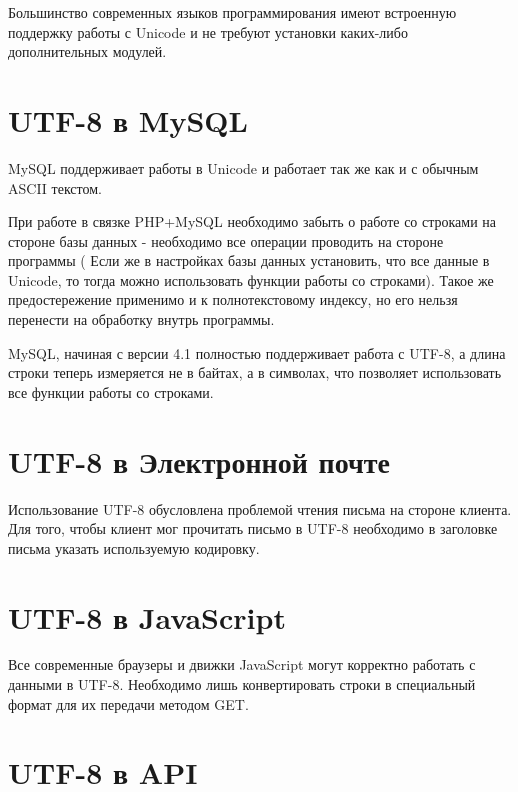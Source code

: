 Большинство современных языков программирования имеют встроенную поддержку работы с Unicode  и не требуют установки каких-либо дополнительных модулей. 


\section{ UTF-8 в MySQL } \label{sect3_11}

MySQL поддерживает работы в Unicode и работает так же как и с обычным ASCII текстом.

При работе в связке PHP+MySQL необходимо забыть о работе со строками на стороне базы данных - необходимо все операции проводить на стороне программы ( Если же в настройках базы данных установить, что все данные в Unicode, то тогда можно использовать функции работы со строками). Такое же предостережение применимо и к полнотекстовому индексу, но его нельзя перенести на обработку внутрь программы.


MySQL, начиная с версии 4.1 полностью поддерживает работа с UTF-8, а длина строки теперь измеряется не в байтах, а в символах, что позволяет использовать все функции работы со строками.


\section{ UTF-8 в Электронной почте } \label{sect3_12}


Использование UTF-8 обусловлена проблемой чтения письма на стороне клиента. Для того, чтобы клиент мог прочитать письмо в UTF-8 необходимо в заголовке письма указать используемую кодировку.

\section{ UTF-8 в JavaScript } \label{sect3_13}


Все современные браузеры и движки JavaScript могут корректно работать с данными в UTF-8. Необходимо лишь конвертировать строки в специальный формат для их передачи методом GET.


\section{ UTF-8 в API } \label{sect3_14}

